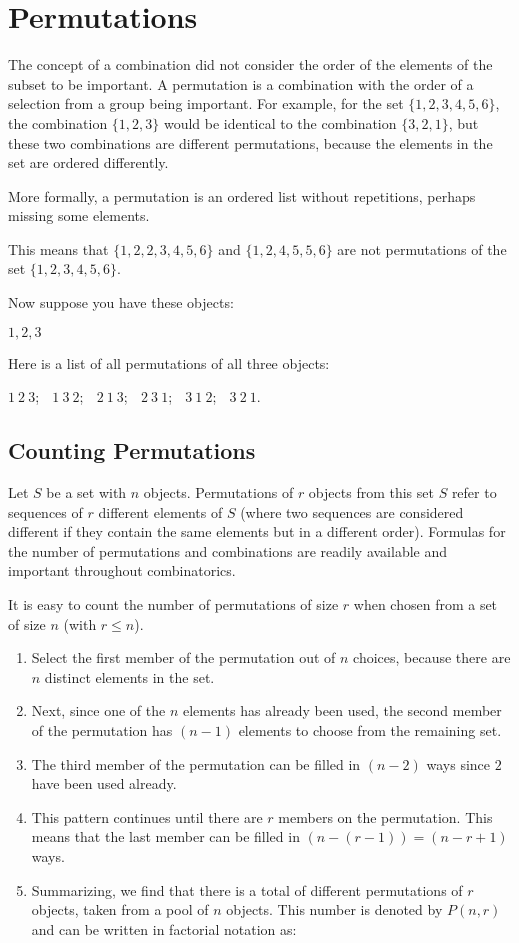 \section{Permutations}
The concept of a combination did not consider the order of the elements of the subset to be important. A permutation is a combination with the order of a selection from a group being important. For example, for the set $\{1, 2, 3, 4, 5, 6\}$, the combination $\{1, 2, 3\}$ would be identical to the combination $\{3, 2, 1\}$, but these two combinations are different permutations, because the elements in the set are ordered differently.

More formally, a permutation is an ordered list without repetitions, perhaps missing some elements.

This means that $\{1, 2, 2, 3, 4, 5, 6\}$ and $\{1, 2, 4, 5, 5, 6\}$ are not permutations of the set $\{1, 2, 3, 4, 5, 6\}$.

Now suppose you have these objects:

$1, 2, 3$

Here is a list of all permutations of all three objects:

$1~2~3$; $\;$
$1~3~2$; $\;$
$2~1~3$; $\;$
$2~3~1$; $\;$
$3~1~2$; $\;$
$3~2~1$. $\;$

\subsection{Counting Permutations}
Let $S$ be a set with $n$ objects. Permutations of $r$ objects from this set $S$ refer to sequences of $r$ different elements of $S$ (where two sequences are considered different if they contain the same elements but in a different order). Formulas for the number of permutations and combinations are readily available and important throughout combinatorics.

It is easy to count the number of permutations of size $r$ when chosen from a set of size $n$ (with $r \le n$).

\begin{enumerate}
\item{Select the first member of the permutation out of $n$ choices, because there are $n$ distinct elements in the set.}
\item{Next, since one of the $n$ elements has already been used, the second member of the permutation has $(n - 1)$ elements to choose from the remaining set.}
\item{The third member of the permutation can be filled in $(n - 2)$ ways since $2$ have been used already.}
\item{This pattern continues until there are $r$ members on the permutation. This means that the last member can be filled in $(n - (r - 1) ) = (n - r + 1)$ ways.}
\item{Summarizing, we find that there is a total of
different permutations of $r$ objects, taken from a pool of $n$ objects. This number is denoted by $P(n, r)$ and can be written in factorial notation as:
}
\end{enumerate}

